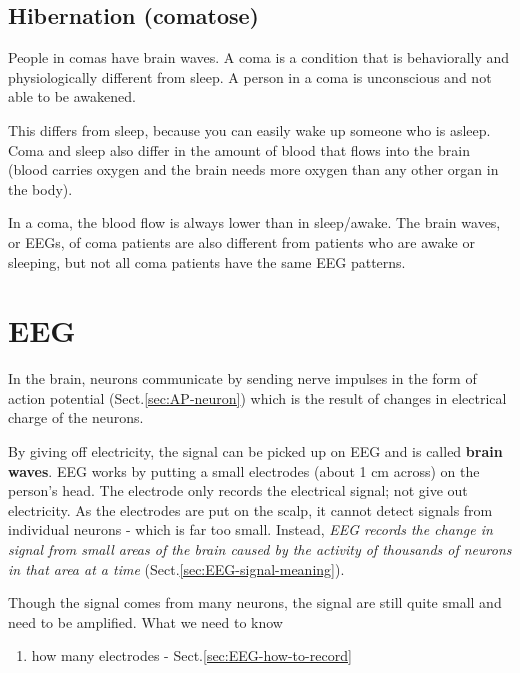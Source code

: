 \subsection{Hibernation (comatose)}
\label{sec:state-brain-hibernate}

People in comas have brain waves. A coma is a condition that is behaviorally and
physiologically different from sleep.  A person in a coma is unconscious and not
able to be awakened.

This differs from sleep, because you can easily wake up someone who is 
asleep.  Coma and sleep also differ in the amount of blood that flows into 
the brain (blood carries oxygen and the brain needs more oxygen than any 
other organ in the body).

In a coma, the  blood flow is always lower than in sleep/awake.  The brain
waves, or EEGs, of coma patients are also different from patients who are awake
or sleeping, but not all coma patients have the same EEG patterns.

\section{EEG}
\label{sec:EEG}
\label{sec:brain-waves}

In the brain, neurons communicate by sending nerve impulses in the form of
action potential (Sect.\ref{sec:AP-neuron}) which is the result of changes in
electrical charge of the neurons. 

By giving off electricity, the signal can be picked up on EEG and is called {\bf
brain waves}. EEG works by putting a small electrodes (about 1 cm across) on the
person's head. The electrode only records the electrical signal; not give out
electricity. As the electrodes are put on the scalp, it cannot detect signals
from individual neurons - which is far too small. Instead, {\it EEG records the
change in signal from small areas of the brain caused by the activity of
thousands of neurons in that area at a time}
(Sect.\ref{sec:EEG-signal-meaning}).

Though the signal comes from many neurons, the signal are still quite small and
need to be amplified.  What we need to know
\begin{enumerate}
  \item how many electrodes - Sect.\ref{sec:EEG-how-to-record}
\end{enumerate}


